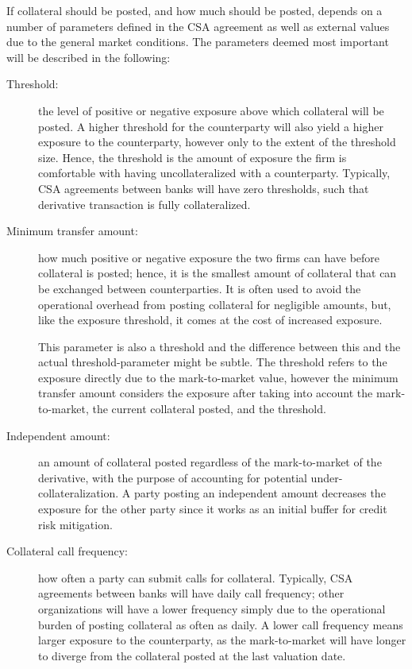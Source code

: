 \documentclass[main.tex]{subfiles}
\begin{document}
        If collateral should be posted, and how much should be posted, 
        depends on a number of parameters defined in the CSA agreement
        as well as external values due to the general market conditions.
        The parameters deemed most important will be described in the following:
        \begin{description}
            \item[Threshold:] 
            the level of positive or negative exposure above which collateral will be posted. 
            A higher threshold for the counterparty will also yield a higher exposure to the counterparty,
            however only to the extent of the threshold size. 
            Hence, the threshold is the amount of exposure the firm is comfortable 
            with having uncollateralized with a counterparty.
            Typically, CSA agreements between banks will have zero thresholds, 
            such that derivative transaction is fully collateralized.
            
            \item[Minimum transfer amount:] 
            how much positive or negative exposure the two firms can have before collateral is posted;
            hence, it is the smallest amount of collateral that can be exchanged between counterparties.
            It is often used to avoid the operational overhead from posting collateral for negligible amounts,
            but, like the exposure threshold, it comes at the cost of increased exposure.

            This parameter is also a threshold and the difference between this
            and the actual threshold-parameter might be subtle.
            The threshold refers to the exposure directly due to the mark-to-market value,
            however the minimum transfer amount considers the exposure after taking into 
            account the mark-to-market, the current collateral posted, and the threshold.

            \item[Independent amount:]
            an amount of collateral posted regardless of the mark-to-market 
            of the derivative, with the purpose of accounting for potential under-collateralization.
            A party posting an independent amount decreases the exposure for the other party
            since it works as an initial buffer for credit risk mitigation.

            \item[Collateral call frequency:]
            how often a party can submit calls for collateral.
            Typically, CSA agreements between banks will have daily call frequency;
            other organizations will have a lower frequency simply due to the operational burden
            of posting collateral as often as daily. 
            A lower call frequency means larger exposure to the counterparty,
            as the mark-to-market will have longer to diverge from the collateral posted 
            at the last valuation date.
        \end{description}
\end{document}
